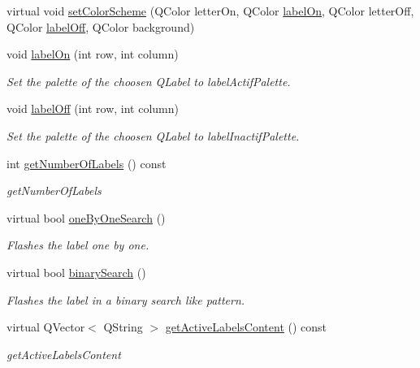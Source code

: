 \begin{DoxyCompactItemize}
\item 
virtual void \hyperlink{class_flashable_a41f0cb7a12eb852f9da9885398d81f06}{set\-Color\-Scheme} (Q\-Color letter\-On, Q\-Color \hyperlink{class_flashable_a0e64bb19355ae3a7a8fe7049476ca850}{label\-On}, Q\-Color letter\-Off, Q\-Color \hyperlink{class_flashable_a639397b5dc6d6d049aee6a5eb8277a79}{label\-Off}, Q\-Color background)
\item 
void \hyperlink{class_flashable_a0e64bb19355ae3a7a8fe7049476ca850}{label\-On} (int row, int column)
\begin{DoxyCompactList}\small\item\em Set the palette of the choosen Q\-Label to label\-Actif\-Palette. \end{DoxyCompactList}\item 
void \hyperlink{class_flashable_a639397b5dc6d6d049aee6a5eb8277a79}{label\-Off} (int row, int column)
\begin{DoxyCompactList}\small\item\em Set the palette of the choosen Q\-Label to label\-Inactif\-Palette. \end{DoxyCompactList}\item 
int \hyperlink{class_flashable_a05949a2d49501a1c990b63f8b15fb31b}{get\-Number\-Of\-Labels} () const 
\begin{DoxyCompactList}\small\item\em get\-Number\-Of\-Labels \end{DoxyCompactList}\item 
virtual bool \hyperlink{class_flashable_a0d309913e4ee2fa8188a313664610eed}{one\-By\-One\-Search} ()
\begin{DoxyCompactList}\small\item\em Flashes the label one by one. \end{DoxyCompactList}\item 
virtual bool \hyperlink{class_flashable_a92ffd8e1de8bcc270e05b5c5ca52fce6}{binary\-Search} ()
\begin{DoxyCompactList}\small\item\em Flashes the label in a binary search like pattern. \end{DoxyCompactList}\item 
virtual Q\-Vector$<$ Q\-String $>$ \hyperlink{class_flashable_a82a7c53ba367243f15d1037667e41042}{get\-Active\-Labels\-Content} () const 
\begin{DoxyCompactList}\small\item\em get\-Active\-Labels\-Content \end{DoxyCompactList}\item 

\end{DoxyCompactItemize}
